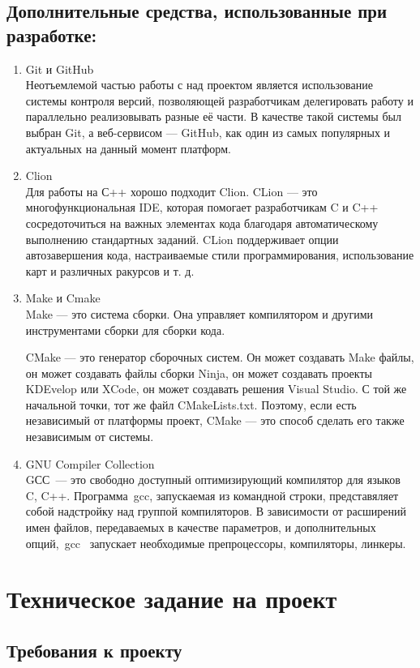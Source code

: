 \documentclass[oneside,final,14pt]{extreport}
\begin{document}
\section{Дополнительные средства, использованные при разработке:}
\begin{enumerate}
	\item Git и GitHub\\
	Неотъемлемой частью работы с над проектом является использование системы контроля версий, позволяющей разработчикам делегировать работу и параллельно реализовывать разные её части. В качестве такой системы был выбран Git, а веб-сервисом — GitHub, как один из самых популярных и актуальных на данный момент платформ.
	\item Clion\\
	Для работы на С++ хорошо подходит Clion. CLion — это многофункциональная IDE, которая помогает разработчикам C и C++ сосредоточиться на важных элементах кода благодаря автоматическому выполнению стандартных заданий.  CLion поддерживает опции автозавершения кода, настраиваемые стили программирования, использование карт и различных ракурсов и т. д.
	\item Make и Cmake\\
	Make — это система сборки. Она управляет компилятором и другими инструментами сборки для сборки кода. 
	
	CMake — это генератор сборочных систем. Он может создавать Make файлы, он может создавать файлы сборки Ninja, он может создавать проекты KDEvelop или XCode, он может создавать решения Visual Studio. С той же начальной точки, тот же файл CMakeLists.txt. Поэтому, если есть независимый от платформы проект, CMake — это способ сделать его также независимым от системы. 
	\item GNU Compiler Collection\\
	GСС — это свободно доступный оптимизирующий компилятор для языков C, C++. Программа gcc, запускаемая из командной строки, представяляет собой надстройку над группой компиляторов. В зависимости от расширений имен файлов, передаваемых в качестве параметров, и дополнительных опций, gcc  запускает необходимые препроцессоры, компиляторы, линкеры.
\end{enumerate}

\newpage
\chapter{Техническое задание на проект}
\section{Требования к проекту}
\end{document}

